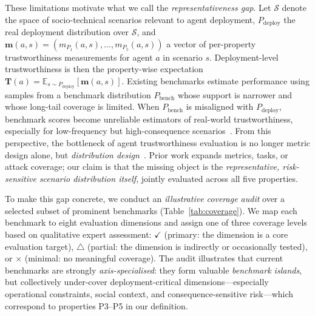These limitations motivate what we call the \emph{representativeness gap}. Let $\mathcal{S}$ denote the space of socio-technical scenarios relevant to agent deployment, $P_{\mathrm{deploy}}$ the real deployment distribution over $\mathcal{S}$, and $\mathbf{m}(a,s)=(m_{P_1}(a,s),\dots,m_{P_5}(a,s))$ a vector of per-property trustworthiness measurements for agent $a$ in scenario $s$. Deployment-level trustworthiness is then the property-wise expectation $\mathbf{T}(a) = \mathbb{E}_{s \sim P_{\mathrm{deploy}}}[\mathbf{m}(a,s)]$. Existing benchmarks estimate performance using samples from a benchmark distribution $P_{\mathrm{bench}}$ whose support is narrower and whose long-tail coverage is limited. When $P_{\mathrm{bench}}$ is misaligned with $P_{\mathrm{deploy}}$, benchmark scores become unreliable estimators of real-world trustworthiness, especially for low-frequency but high-consequence scenarios~\cite{eriksson2025trustbenchmarks}. From this perspective, the bottleneck of agent trustworthiness evaluation is no longer metric design alone, but \emph{distribution design}~\cite{liang2023helm,kiela2021dynabench,shirali2022dynamicbench,koh2021wilds}. Prior work expands metrics, tasks, or attack coverage; our claim is that the missing object is the \emph{representative, risk-sensitive scenario distribution itself}, jointly evaluated across all five properties.

To make this gap concrete, we conduct an \emph{illustrative coverage audit} over a selected subset of prominent benchmarks (Table~\ref{tab:coverage}). We map each benchmark to eight evaluation dimensions and assign one of three coverage levels based on qualitative expert assessment: $\checkmark$ (primary: the dimension is a core evaluation target), $\triangle$ (partial: the dimension is indirectly or occasionally tested), or $\times$ (minimal: no meaningful coverage). The audit illustrates that current benchmarks are strongly \emph{axis-specialised}: they form valuable \emph{benchmark islands}, but collectively under-cover deployment-critical dimensions---especially operational constraints, social context, and consequence-sensitive risk---which correspond to properties P3--P5 in our definition.

